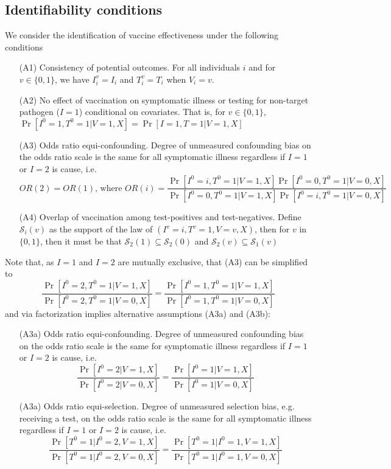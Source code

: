 \documentclass[11pt]{article}
\begin{document}
\subsection{Identifiability conditions} \label{sec:conditions}
We consider the identification of vaccine effectiveness under the following conditions
\begin{itemize}
    \item[(A1)] Consistency of potential outcomes. For all individuals $i$ and for $v \in \{0, 1\}$, we have $I_i^v = I_i$ and $T_i^v = T_i$ when $V_i = v$.
    \item[(A2)] No effect of vaccination on symptomatic illness or testing for non-target pathogen ($I = 1$) conditional on covariates. That is, for $v \in \{0, 1\}$, $\Pr[I^0 = 1, T^0 = 1 | V = 1, X] = \Pr[I = 1, T = 1 | V = 1, X]$
    \item[(A3)] Odds ratio equi-confounding. Degree of unmeasured confounding bias on the odds ratio scale is the same for all symptomatic illness regardless if $I=1$ or $I=2$ is cause, i.e. 
    $$OR(2) = OR(1) \text{, where } OR(i) = \frac{\Pr[I^0 = i, T^0 = 1 | V = 1, X]\Pr[I^0 = 0, T^0 = 1 | V = 0, X]}{\Pr[I^0 = 0, T^0 = 1 | V = 1, X]\Pr[I^0 = i, T^0 = 1| V = 0, X]} $$
    \item[(A4)] Overlap of vaccination among test-positives and test-negatives. Define $\mathcal{S}_i(v)$ as the support of the law of $(I^v = i, T^v = 1, V = v, X)$, then for $v$ in $\{0,1\}$, then it must be that $\mathcal{S}_2(1) \subseteq \mathcal{S}_2(0)$ and $\mathcal{S}_2(v) \subseteq \mathcal{S}_1(v)$
\end{itemize}
Note that, as $I = 1$ and $I = 2$ are mutually exclusive, that (A3) can be simplified to
$$\frac{\Pr[I^0 = 2, T^0 = 1 | V = 1, X]}{\Pr[I^0 = 2, T^0 = 1 | V = 0, X]} =\frac{\Pr[I^0 = 1, T^0 = 1 | V = 1, X]}{\Pr[I^0 = 1, T^0 = 1 | V = 0, X]}$$
and via factorization implies alternative assumptions (A3a) and (A3b):
\begin{itemize}
    \item[(A3a)] Odds ratio equi-confounding. Degree of unmeasured confounding bias on the odds ratio scale is the same for symptomatic illness regardless if $I=1$ or $I=2$ is cause, i.e. 
    $$\frac{\Pr[I^0 = 2 | V = 1, X]}{\Pr[I^0 = 2 | V = 0, X]} =\frac{\Pr[I^0 = 1 | V = 1, X]}{\Pr[I^0 = 1 | V = 0, X]}$$
    \item[(A3a)] Odds ratio equi-selection. Degree of unmeasured selection bias, e.g. receiving a test, on the odds ratio scale is the same for all symptomatic illness regardless if $I=1$ or $I=2$ is cause, i.e. 
    $$\frac{\Pr[T^0 = 1 | I^0 = 2, V = 1, X]}{\Pr[T^0 = 1 | I^0 = 2, V = 0, X]} =\frac{\Pr[T^0 = 1 | I^0 = 1, V = 1, X]}{\Pr[T^0 = 1 | I^0 = 1, V = 0, X]}$$
\end{itemize}
\end{document}
